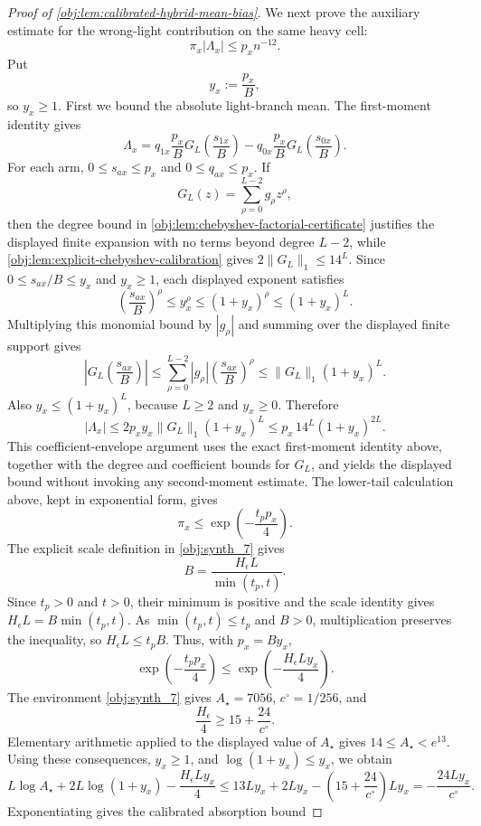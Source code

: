 \documentclass[11pt]{article}
\begin{document}
\begin{proof}[Proof of \cref{obj:lem:calibrated-hybrid-mean-bias}]
We next prove the auxiliary estimate for the wrong-light contribution on the same heavy cell:
\[
\pi_x|\Lambda_x|\le p_x n^{-12}.
\]
Put
\[
y_x:=\frac{p_x}{B},
\]
so \(y_x\ge1\).  First we bound the absolute light-branch mean.  The first-moment identity gives
\[
\Lambda_x
=
q_{1x}\frac{p_x}{B}G_L\!\left(\frac{s_{1x}}B\right)
-
q_{0x}\frac{p_x}{B}G_L\!\left(\frac{s_{0x}}B\right).
\]
For each arm, \(0\le s_{ax}\le p_x\) and \(0\le q_{ax}\le p_x\).  If
\[
G_L(z)=\sum_{\rho=0}^{L-2} g_\rho z^\rho,
\]
then the degree bound in \cref{obj:lem:chebyshev-factorial-certificate} justifies the displayed finite expansion with no terms beyond degree \(L-2\), while \cref{obj:lem:explicit-chebyshev-calibration} gives
\(2\|G_L\|_1\le14^L\).  Since \(0\le s_{ax}/B\le y_x\) and \(y_x\ge1\), each displayed exponent satisfies
\[
\left(\frac{s_{ax}}B\right)^\rho\le y_x^\rho\le(1+y_x)^\rho\le(1+y_x)^L.
\]
Multiplying this monomial bound by \(|g_\rho|\) and summing over the displayed finite support gives
\[
\left|G_L\!\left(\frac{s_{ax}}B\right)\right|
\le \sum_{\rho=0}^{L-2}|g_\rho|\left(\frac{s_{ax}}B\right)^\rho
\le \|G_L\|_1(1+y_x)^L.
\]
Also \(y_x\le(1+y_x)^L\), because \(L\ge2\) and \(y_x\ge0\).  Therefore
\[
|\Lambda_x|
\le
2p_xy_x\|G_L\|_1(1+y_x)^L
\le
p_x\,14^L(1+y_x)^{2L}.
\]
This coefficient-envelope argument uses the exact first-moment identity above, together with the degree and coefficient bounds for \(G_L\), and yields the displayed bound without invoking any second-moment estimate.
The lower-tail calculation above, kept in exponential form, gives
\[
\pi_x\le\exp\!\left(-\frac{t_pp_x}{4}\right).
\]
The explicit scale definition in \cref{obj:synth_7} gives
\[
B=\frac{H_\epsilon L}{\min(t_p,t)}.
\]
Since \(t_p>0\) and \(t>0\), their minimum is positive and the scale identity
gives \(H_\epsilon L=B\min(t_p,t)\).  As \(\min(t_p,t)\le t_p\) and
\(B>0\), multiplication preserves the inequality, so \(H_\epsilon L\le
t_pB\).  Thus, with \(p_x=By_x\),
\[
\exp\!\left(-\frac{t_pp_x}{4}\right)
\le
\exp\!\left(-\frac{H_\epsilon Ly_x}{4}\right).
\]
The environment \cref{obj:synth_7} gives \(A_\star=7056\),
\(c^\circ=1/256\), and
\[
\frac{H_\epsilon}{4}\ge 15+\frac{24}{c^\circ}.
\]
Elementary arithmetic applied to the displayed value of \(A_\star\) gives
\(14\le A_\star<e^{13}\).  Using these consequences, \(y_x\ge1\), and
\(\log(1+y_x)\le y_x\), we obtain
\[
L\log A_\star+2L\log(1+y_x)-\frac{H_\epsilon Ly_x}{4}
\le
13Ly_x+2Ly_x-\left(15+\frac{24}{c^\circ}\right)Ly_x
=
-\frac{24Ly_x}{c^\circ}.
\]
Exponentiating gives the calibrated absorption bound

\end{proof}
\end{document}
